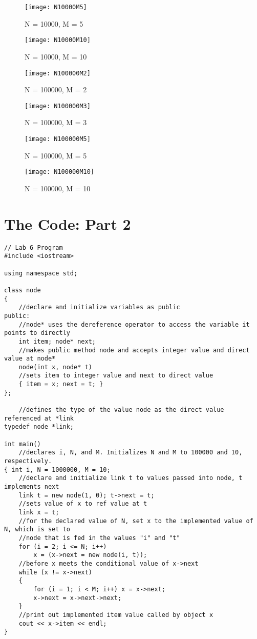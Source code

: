 \documentclass[11pt]{article}
\begin{document}
\begin{figure}[h]
    \centering
    \texttt{[image: N10000M5]}
    \caption{N = 10000, M = 5}
\end{figure}

\begin{figure}[h]
    \centering
    \texttt{[image: N10000M10]}
    \caption{N = 10000, M = 10}
\end{figure}

\begin{figure}[h]
    \centering
    \texttt{[image: N100000M2]}
    \caption{N = 100000, M = 2}
\end{figure}

\begin{figure}[h]
    \centering
    \texttt{[image: N100000M3]}
    \caption{N = 100000, M = 3}
\end{figure}

\begin{figure}[h]
    \centering
    \texttt{[image: N100000M5]}
    \caption{N = 100000, M = 5}
\end{figure}

\begin{figure}[h]
    \centering
    \texttt{[image: N100000M10]}
    \caption{N = 100000, M = 10}
\end{figure}


\newpage
\section{The Code: Part 2}
\begin{lstlisting}
// Lab 6 Program 
#include <iostream>

using namespace std;

class node
{
    //declare and initialize variables as public
public:
    //node* uses the dereference operator to access the variable it points to directly
    int item; node* next;
    //makes public method node and accepts integer value and direct value at node*
    node(int x, node* t)
    //sets item to integer value and next to direct value
    { item = x; next = t; }
};

    //defines the type of the value node as the direct value referenced at *link
typedef node *link;

int main()
    //declares i, N, and M. Initializes N and M to 100000 and 10, respectively.
{ int i, N = 1000000, M = 10;
    //declare and initialize link t to values passed into node, t implements next
    link t = new node(1, 0); t->next = t;
    //sets value of x to ref value at t
    link x = t;
    //for the declared value of N, set x to the implemented value of N, which is set to
    //node that is fed in the values "i" and "t"
    for (i = 2; i <= N; i++)
        x = (x->next = new node(i, t));
    //before x meets the conditional value of x->next
    while (x != x->next)
    {
        for (i = 1; i < M; i++) x = x->next;
        x->next = x->next->next;
    }
    //print out implemented item value called by object x
    cout << x->item << endl;
}
\end{lstlisting}
\end{document}
